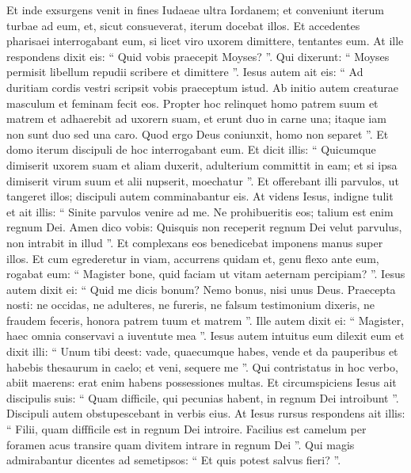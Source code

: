 \begin{biblechapter}
\begin{biblechapter}
\begin{biblechapter}
\begin{biblechapter}
\begin{biblechapter}
\begin{biblechapter}
\begin{biblechapter}
\begin{biblechapter}
\begin{biblechapter}
\begin{biblechapter}
\verse Et inde exsurgens venit in fines Iudaeae ultra Iordanem; et conveniunt iterum turbae ad eum, et, sicut consueverat, iterum docebat illos. 
\verse Et accedentes pharisaei interrogabant eum, si licet viro uxorem dimittere, tentantes eum. 
\verse At ille respondens dixit eis: “ Quid vobis praecepit Moyses? ”. 
\verse Qui dixerunt: “ Moyses permisit libellum repudii scribere et dimittere ”. 
\verse Iesus autem ait eis: “ Ad duritiam cordis vestri scripsit vobis praeceptum istud. 
\verse Ab initio autem creaturae masculum et feminam fecit eos. 
\verse Propter hoc relinquet homo patrem suum et matrem et adhaerebit ad uxorern suam, 
\verse et erunt duo in carne una; itaque iam non sunt duo sed una caro. 
\verse Quod ergo Deus coniunxit, homo non separet ”. 
\verse Et domo iterum discipuli de hoc interrogabant eum. 
\verse Et dicit illis: “ Quicumque dimiserit uxorem suam et aliam duxerit, adulterium committit in eam; 
\verse et si ipsa dimiserit virum suum et alii nupserit, moechatur ”.
 \verse Et offerebant illi parvulos, ut tangeret illos; discipuli autem comminabantur eis. 
\verse At videns Iesus, indigne tulit et ait illis: “ Sinite parvulos venire ad me. Ne prohibueritis eos; talium est enim regnum Dei. 
\verse Amen dico vobis: Quisquis non receperit regnum Dei velut parvulus, non intrabit in illud ”. 
\verse Et complexans eos benedicebat imponens manus super illos.
 \verse Et cum egrederetur in viam, accurrens quidam et, genu flexo ante eum, rogabat eum: “ Magister bone, quid faciam ut vitam aeternam percipiam? ”. 
\verse Iesus autem dixit ei: “ Quid me dicis bonum? Nemo bonus, nisi unus Deus. 
\verse Praecepta nosti: ne occidas, ne adulteres, ne fureris, ne falsum testimonium dixeris, ne fraudem feceris, honora patrem tuum et matrem ”.
 \verse Ille autem dixit ei: “ Magister, haec omnia conservavi a iuventute mea ”. 
\verse Iesus autem intuitus eum dilexit eum et dixit illi: “ Unum tibi deest: vade, quaecumque habes, vende et da pauperibus et habebis thesaurum in caelo; et veni, sequere me ”. 
\verse Qui contristatus in hoc verbo, abiit maerens: erat enim habens possessiones multas.
 \verse Et circumspiciens Iesus ait discipulis suis: “ Quam difficile, qui pecunias habent, in regnum Dei introibunt ”. 
\verse Discipuli autem obstupescebant in verbis eius. At Iesus rursus respondens ait illis: “ Filii, quam diffficile est in regnum Dei introire. 
\verse Facilius est camelum per foramen acus transire quam divitem intrare in regnum Dei ”. 
\verse Qui magis admirabantur dicentes ad semetipsos: “ Et quis potest salvus fieri? ”. 

\end{biblechapter}
\end{biblechapter}
\end{biblechapter}
\end{biblechapter}
\end{biblechapter}
\end{biblechapter}
\end{biblechapter}
\end{biblechapter}
\end{biblechapter}
\end{biblechapter}
